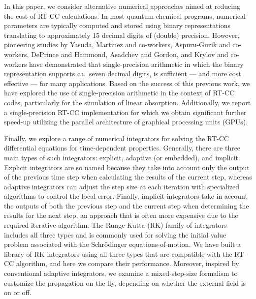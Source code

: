 In this paper, we consider alternative numerical approaches aimed at reducing
the cost of RT-CC calculations.  In most quantum chemical programs,
numerical parameters are typically computed and stored using binary
representations translating to approximately 15 decimal digits of (double)
precision.  However, pioneering studies by Yasuda,\cite{Yasuda2008} Martinez and
co-workers,\cite{Ufimtsev2008,Ufimtsev2008quantum,Luehr2011} Aspuru-Guzik and
co-workers,\cite{Vogt2008} DePrince and Hammond,\cite{DePrince2011} Asadchev and Gordon\cite{Asadchev2012}, and Krylov
and co-workers\cite{Pokhilko2018} have demonstrated that single-precision
arithmetic in which the binary representation supports ca.\ seven decimal
digits, is sufficient --- and more cost effective --- for many applications.
Based on the success of this previous work, we have explored the use of
single-precision arithmetic in the context of RT-CC codes, particularly
for the simulation of linear absorption.
Additionally, we report a single-precision RT-CC implementation for which we
obtain significant further speed-up utilizing the parallel architecture of
graphical processing units (GPUs).

Finally, we explore a range of numerical integrators for solving the RT-CC
differential equations for time-dependent properties.  Generally, there are
three main types of such integrators: explicit, adaptive (or embedded), and
implicit.  Explicit integrators are so named because they take into account
only the output of the previous time step when calculating the results of the
current step, whereas adaptive integrators can adjust the step size at each
iteration with specialized algorithms to control the local error. Finally,
implicit integrators take in account the outputs of both the previous step and
the current step when determining the results for the next step, an approach
that is often more expensive due to the required iterative algorithm.
The Runge-Kutta (RK) family of integrators\cite{Butcher1996} includes all
three types and is commonly used for solving the initial value problem
associated with the Schr\"odinger equations-of-motion.  We have built a library of RK
integrators using all three types that are compatible with the RT-CC
algorithm, and here we compare their performance.  Moreover, inspired by
conventional adaptive integrators, we examine a mixed-step-size formalism to
customize the propagation on the fly, depending on whether the external field
is on or off.



